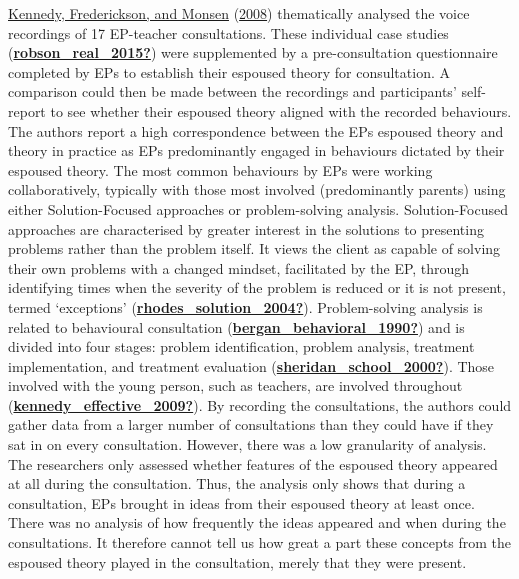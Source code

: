 \documentclass[
]{article}
\begin{document}
\protect\hyperlink{ref-kennedyEducationalPsychologistsWalk2008}{Kennedy,
Frederickson, and Monsen}
(\protect\hyperlink{ref-kennedyEducationalPsychologistsWalk2008}{2008})
thematically analysed the voice recordings of 17 EP-teacher
consultations. These individual case studies
(\protect\hyperlink{ref-robson_real_2015}{\textbf{robson\_real\_2015?}})
were supplemented by a pre-consultation questionnaire completed by EPs
to establish their espoused theory for consultation. A comparison could
then be made between the recordings and participants' self-report to see
whether their espoused theory aligned with the recorded behaviours. The
authors report a high correspondence between the EPs espoused theory and
theory in practice as EPs predominantly engaged in behaviours dictated
by their espoused theory. The most common behaviours by EPs were working
collaboratively, typically with those most involved (predominantly
parents) using either Solution-Focused approaches or problem-solving
analysis. Solution-Focused approaches are characterised by greater
interest in the solutions to presenting problems rather than the problem
itself. It views the client as capable of solving their own problems
with a changed mindset, facilitated by the EP, through identifying times
when the severity of the problem is reduced or it is not present, termed
`exceptions'
(\protect\hyperlink{ref-rhodes_solution_2004}{\textbf{rhodes\_solution\_2004?}}).
Problem-solving analysis is related to behavioural consultation
(\protect\hyperlink{ref-bergan_behavioral_1990}{\textbf{bergan\_behavioral\_1990?}})
and is divided into four stages: problem identification, problem
analysis, treatment implementation, and treatment evaluation
(\protect\hyperlink{ref-sheridan_school_2000}{\textbf{sheridan\_school\_2000?}}).
Those involved with the young person, such as teachers, are involved
throughout
(\protect\hyperlink{ref-kennedy_effective_2009}{\textbf{kennedy\_effective\_2009?}}).
By recording the consultations, the authors could gather data from a
larger number of consultations than they could have if they sat in on
every consultation. However, there was a low granularity of analysis.
The researchers only assessed whether features of the espoused theory
appeared at all during the consultation. Thus, the analysis only shows
that during a consultation, EPs brought in ideas from their espoused
theory at least once. There was no analysis of how frequently the ideas
appeared and when during the consultations. It therefore cannot tell us
how great a part these concepts from the espoused theory played in the
consultation, merely that they were present.
\end{document}

